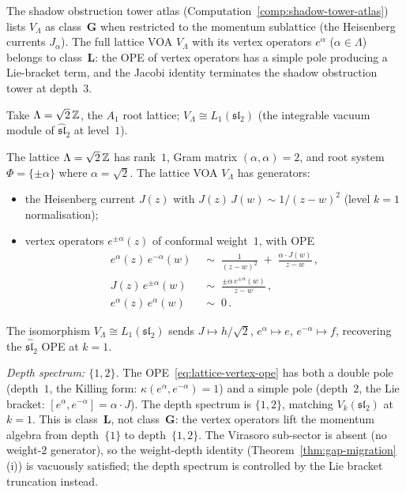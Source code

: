 The shadow obstruction tower atlas
(Computation~\ref{comp:shadow-tower-atlas}) lists $V_\Lambda$
as class~$\mathbf{G}$ when restricted to the momentum
sublattice (the Heisenberg currents $J_\alpha$). The full
lattice VOA $V_\Lambda$ with its vertex operators
$e^\alpha$ ($\alpha \in \Lambda$) belongs to class~$\mathbf{L}$:
the OPE of vertex operators has a simple pole producing a
Lie-bracket term, and the Jacobi identity terminates the
shadow obstruction tower at depth~$3$.

Take $\Lambda = \sqrt{2}\,\mathbb{Z}$, the $A_1$ root lattice; $V_\Lambda \cong L_1(\mathfrak{sl}_2)$ (the integrable vacuum module of $\widehat{\mathfrak{sl}}_2$ at level~$1$).

\begin{computation}%
\label{comp:lattice-voa-ordered-bar}%
%
%
%
The lattice $\Lambda = \sqrt{2}\,\mathbb{Z}$ has rank~$1$,
Gram matrix $(\alpha, \alpha) = 2$, and root system
$\Phi = \{\pm\alpha\}$ where $\alpha = \sqrt{2}$. The
lattice VOA $V_\Lambda$ has generators:
\begin{itemize}[nosep]
\item the Heisenberg current $J(z)$ with
 $J(z)\,J(w) \sim 1/(z-w)^2$
 (level $k = 1$ normalisation);
\item vertex operators $e^{\pm\alpha}(z)$ of
 conformal weight~$1$, with OPE
 \begin{align}
 e^\alpha(z)\, e^{-\alpha}(w)
 &\;\sim\;
 \frac{1}{(z-w)^2}
 \;+\;
 \frac{\alpha \cdot J(w)}{z-w}\,,
 \label{eq:lattice-vertex-ope}
 \\[3pt]
 J(z)\, e^{\pm\alpha}(w)
 &\;\sim\;
 \frac{\pm\alpha\, e^{\pm\alpha}(w)}{z-w}\,,
 \label{eq:lattice-current-vertex-ope}
 \\[3pt]
 e^{\alpha}(z)\, e^{\alpha}(w)
 &\;\sim\; 0\,.
 \label{eq:lattice-vertex-vertex-vanishing}
 \end{align}
\end{itemize}
The isomorphism $V_\Lambda \cong L_1(\mathfrak{sl}_2)$
sends $J \mapsto h/\sqrt{2}$,
$e^\alpha \mapsto e$, $e^{-\alpha} \mapsto f$,
recovering the $\widehat{\mathfrak{sl}}_2$ OPE at $k = 1$.

\smallskip
\noindent
\emph{Depth spectrum: $\{1,2\}$.}
The OPE~\eqref{eq:lattice-vertex-ope} has both a double pole
(depth~$1$, the Killing form: $\kappa(e^\alpha, e^{-\alpha}) = 1$)
and a simple pole (depth~$2$, the Lie bracket:
$[e^\alpha, e^{-\alpha}] = \alpha \cdot J$). The depth spectrum
is $\{1, 2\}$, matching $V_k(\mathfrak{sl}_2)$ at $k = 1$.
This is class~$\mathbf{L}$, not class~$\mathbf{G}$:
the vertex operators lift the momentum algebra from depth~$\{1\}$
to depth~$\{1,2\}$.
The Virasoro sub-sector is absent (no weight-$2$ generator), so the weight-depth identity (Theorem~\ref{thm:gap-migration}(i)) is vacuously satisfied; the depth spectrum is controlled by the Lie bracket truncation instead.


\end{computation}
